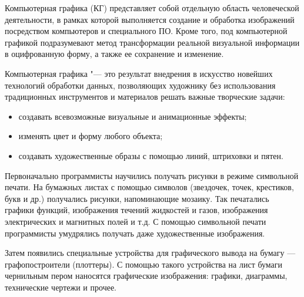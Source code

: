 \documentclass[referat]{SCWorks}
\begin{document}
\tableofcontents




\intro
Компьютерная графика (КГ) представляет собой отдельную область человеческой деятельности, в рамках которой выполняется создание и обработка изображений посредством компьютеров и специального ПО. Кроме того, под компьютерной графикой подразумевают метод трансформации реальной визуальной информации в оцифрованную форму, а также ее сохранение и изменение.

Компьютерная графика "--- это результат внедрения в искусство новейших технологий обработки данных, позволяющих художнику без использования традиционных инструментов и материалов решать важные творческие задачи:

\begin{itemize}
    \item создавать всевозможные визуальные и анимационные эффекты; 
    \item изменять цвет и форму любого объекта;
    \item создавать художественные образы с помощью линий, штриховки и пятен.
\end{itemize}

Первоначально программисты научились получать рисунки в режиме символьной печати. На бумажных листах с помощью символов (звездочек, точек, крестиков, букв и др.) получались рисунки, напоминающие мозаику. Так печатались графики функций, изображения течений жидкостей и газов, изображения электрических и магнитных полей и т.д. С помощью символьной печати программисты умудрялись получать даже художественные изображения. 

Затем появились специальные устройства для графического вывода на бумагу — графопостроители (плоттеры). С помощью такого устройства на лист бумаги чернильным пером наносятся графические изображения: графики, диаграммы, технические чертежи и прочее.
\end{document}
